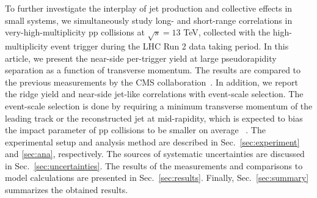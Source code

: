 To further investigate the interplay of jet production and collective effects in small systems, we simultaneously study long- and short-range correlations in very-high-multiplicity pp collisions at $\sqrt{s} =13$ TeV, collected with the high-multiplicity event trigger during the LHC Run 2 data taking period. In this article, we present the near-side per-trigger yield at large pseudorapidity separation as a function of transverse momentum. The results are compared to the previous measurements by the CMS collaboration~\cite{Khachatryan:2015lva}. %
In addition, we report the ridge yield and near-side jet-like correlations with event-scale selection. The event-scale selection is done by requiring a minimum transverse momentum of the leading track or the reconstructed jet at mid-rapidity, which is expected to bias the impact parameter of pp collisions to be smaller on average ~\cite{Sjostrand:1986ep,Frankfurt:2010ea}.
The experimental setup and analysis method are described in Sec.~\ref{sec:experiment} and \ref{sec:ana}, respectively. The sources of systematic uncertainties are discussed in Sec.~\ref{sec:uncertainties}. The results of the measurements and comparisons to model calculations are presented in Sec.~\ref{sec:results}. Finally, Sec.~\ref{sec:summary} summarizes the obtained results.


